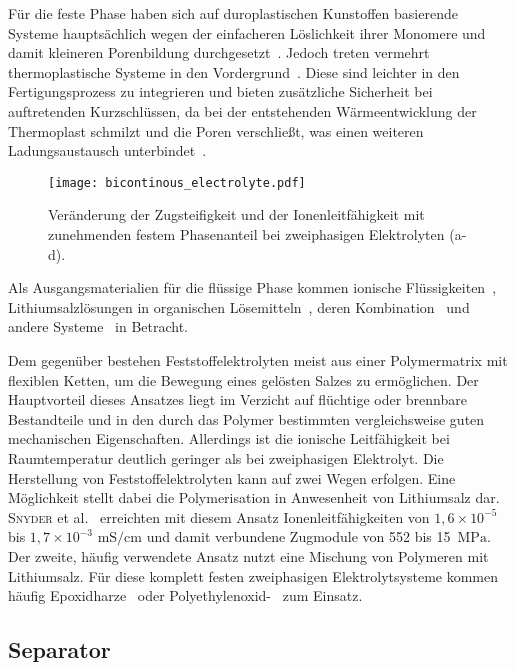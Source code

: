 Für die feste Phase haben sich auf duroplastischen Kunstoffen basierende Systeme hauptsächlich wegen der einfacheren Löslichkeit ihrer Monomere und damit kleineren Porenbildung durchgesetzt~\cite{Snyder2009,Li2018,Choi2018,Lee2019}. Jedoch treten vermehrt thermoplastische Systeme in den Vordergrund~\cite{Melodia2023}. Diese sind leichter in den Fertigungsprozess zu integrieren und bieten zusätzliche Sicherheit bei auftretenden Kurzschlüssen, da bei der entstehenden Wärmeentwicklung der Thermoplast schmilzt und die Poren verschließt, was einen weiteren Ladungsaustausch unterbindet~\cite{Roth2012}.
\begin{figure}[ht]
        \center
	\texttt{[image: bicontinous\_electrolyte.pdf]}
		\caption{\label{fig:bicontinous_electrolyte}Veränderung der Zugsteifigkeit und der Ionenleitfähigkeit mit zunehmenden festem Phasenanteil bei zweiphasigen Elektrolyten (a-d).}
\end{figure}
Als Ausgangsmaterialien für die flüssige Phase kommen ionische Flüssigkeiten~\cite{Huang2022,Shirshova2013,Wendong2021,Shirshova2014,Dzienia2020}, Lithiumsalzlösungen in organischen Lösemitteln~\cite{Gienger2015,Sakakibara2017}, deren Kombination~\cite{Shirshova2014,Yu2016} und andere Systeme~\cite{Feng2017} in Betracht.

Dem gegenüber bestehen Feststoffelektrolyten meist aus einer Polymermatrix mit flexiblen Ketten, um die Bewegung eines gelösten Salzes zu ermöglichen. Der Hauptvorteil dieses Ansatzes liegt im Verzicht auf flüchtige oder brennbare Bestandteile und in den durch das Polymer bestimmten vergleichsweise guten mechanischen Eigenschaften. Allerdings ist die ionische Leitfähigkeit bei Raumtemperatur deutlich geringer als bei zweiphasigen Elektrolyt. Die Herstellung von Feststoffelektrolyten kann auf zwei Wegen erfolgen. Eine Möglichkeit stellt dabei die Polymerisation in Anwesenheit von Lithiumsalz dar. \textsc{Snyder} et al.~\cite{Snyder2007, Snyder2009} erreichten mit diesem Ansatz Ionenleitfähigkeiten von $1,6 \times 10^{-5}$ bis $1,7 \times 10^{-3}$ $\si{\milli \siemens \per \cm}$ und damit verbundene Zugmodule von 552 bis 15~$\si{\MPa}$. Der zweite, häufig verwendete Ansatz nutzt eine Mischung von Polymeren mit Lithiumsalz. Für diese komplett festen zweiphasigen Elektrolytsysteme kommen häufig Epoxidharze~\cite{Matsumoto2011,Munoz2021,Wang2020b} oder Polyethylenoxid-~\cite{Moreno2011,Ji2010,Guo2021} zum Einsatz.

\subsection{Separator}

